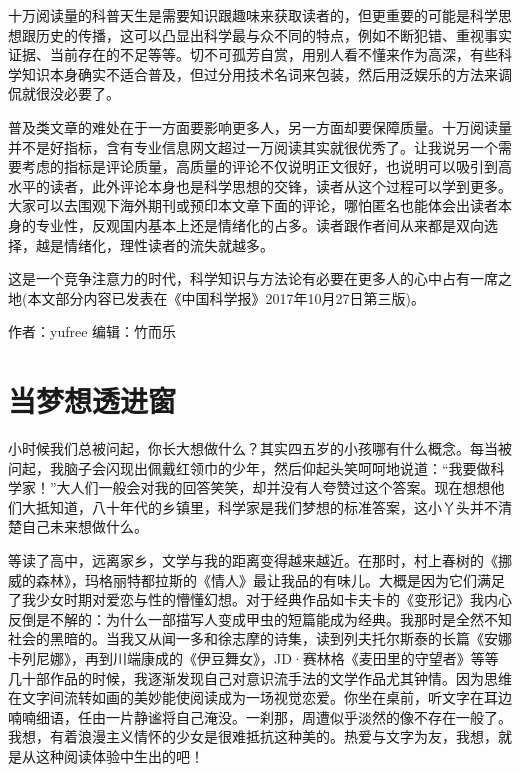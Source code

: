 \documentclass[]{book}
\begin{document}
十万阅读量的科普天生是需要知识跟趣味来获取读者的，但更重要的可能是科学思想跟历史的传播，这可以凸显出科学最与众不同的特点，例如不断犯错、重视事实证据、当前存在的不足等等。切不可孤芳自赏，用别人看不懂来作为高深，有些科学知识本身确实不适合普及，但过分用技术名词来包装，然后用泛娱乐的方法来调侃就很没必要了。

普及类文章的难处在于一方面要影响更多人，另一方面却要保障质量。十万阅读量并不是好指标，含有专业信息网文超过一万阅读其实就很优秀了。让我说另一个需要考虑的指标是评论质量，高质量的评论不仅说明正文很好，也说明可以吸引到高水平的读者，此外评论本身也是科学思想的交锋，读者从这个过程可以学到更多。大家可以去围观下海外期刊或预印本文章下面的评论，哪怕匿名也能体会出读者本身的专业性，反观国内基本上还是情绪化的占多。读者跟作者间从来都是双向选择，越是情绪化，理性读者的流失就越多。

这是一个竞争注意力的时代，科学知识与方法论有必要在更多人的心中占有一席之地(本文部分内容已发表在《中国科学报》2017年10月27日第三版)。

作者：yufree 编辑：竹而乐

\section{当梦想透进窗}

小时候我们总被问起，你长大想做什么？其实四五岁的小孩哪有什么概念。每当被问起，我脑子会闪现出佩戴红领巾的少年，然后仰起头笑呵呵地说道：``我要做科学家！''大人们一般会对我的回答笑笑，却并没有人夸赞过这个答案。现在想想他们大抵知道，八十年代的乡镇里，科学家是我们梦想的标准答案，这小丫头并不清楚自己未来想做什么。

等读了高中，远离家乡，文学与我的距离变得越来越近。在那时，村上春树的《挪威的森林》，玛格丽特都拉斯的《情人》最让我品的有味儿。大概是因为它们满足了我少女时期对爱恋与性的懵懂幻想。对于经典作品如卡夫卡的《变形记》我内心反倒是不解的：为什么一部描写人变成甲虫的短篇能成为经典。我那时是全然不知社会的黑暗的。当我又从闻一多和徐志摩的诗集，读到列夫托尔斯泰的长篇《安娜卡列尼娜》，再到川端康成的《伊豆舞女》，JD·赛林格《麦田里的守望者》等等几十部作品的时候，我逐渐发现自己对意识流手法的文学作品尤其钟情。因为思维在文字间流转如画的美妙能使阅读成为一场视觉恋爱。你坐在桌前，听文字在耳边喃喃细语，任由一片静谧将自己淹没。一刹那，周遭似乎淡然的像不存在一般了。我想，有着浪漫主义情怀的少女是很难抵抗这种美的。热爱与文字为友，我想，就是从这种阅读体验中生出的吧！
\end{document}
